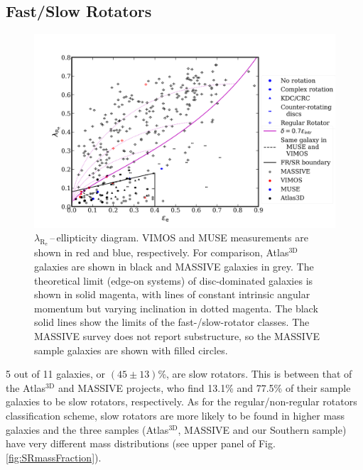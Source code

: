 \documentclass[a4paper,fleqn,usenatbib]{mnras}
\begin{document}
	\subsection{Fast/Slow Rotators}
		\begin{figure}
			\includegraphics[width=\columnwidth]{lambda_R_ellipticity.png}
			\caption{$\lambda_\mathrm{R_e}$\,--\,ellipticity diagram. VIMOS and MUSE measurements are shown in red and blue, respectively. For comparison, Atlas$^\text{3D}$ galaxies \citep{Emsellem2011} are shown in black and MASSIVE galaxies \citep{Veale2017} in grey. The theoretical limit (edge-on systems) of disc-dominated galaxies is shown in solid magenta, with lines of constant intrinsic angular momentum but varying inclination in dotted magenta. The black solid lines show the limits of the fast-/slow-rotator classes. The MASSIVE survey does not report substructure, so the MASSIVE sample galaxies are shown with filled circles.}
			\label{fig:lambdaR_ellip}
		\end{figure}


		5 out of 11 galaxies, or $(45\pm13)$\%, are slow rotators. This is between that of the Atlas$^\text{3D}$ and MASSIVE projects, who find 13.1\% and 77.5\% of their sample galaxies to be slow rotators, respectively. As for the regular/non-regular rotators classification scheme, slow rotators are more likely to be found in higher mass galaxies and the three samples (Atlas$^\text{3D}$, MASSIVE and our Southern sample) have very different mass distributions (see upper panel of Fig.\,\ref{fig:SRmassFraction}).
\end{document}
